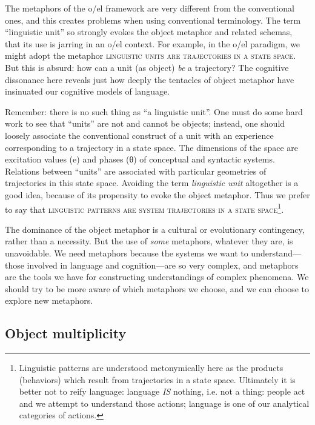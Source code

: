   The metaphors of the o/el framework are very different from the conventional ones, and this creates problems when using conventional terminology. The term “linguistic unit” so strongly evokes the object metaphor and related schemas, that its use is jarring in an o/el context. For example, in the o/el paradigm, we might adopt the metaphor \textsc{linguistic units are trajectories in a state space}. But this is absurd: how can a unit (as object) \textit{be} a trajectory? The cognitive dissonance here reveals just how deeply the tentacles of object metaphor have insinuated our cognitive models of language.

  Remember: there is no such thing as “a linguistic unit”. One must do some hard work to see that “units” are not and cannot be objects; instead, one should loosely associate the conventional construct of a unit with an experience corresponding to a trajectory in a state space. The dimensions of the space are excitation values (e) and phases (θ) of conceptual and syntactic systems. Relations between “units” are associated with particular geometries of trajectories in this state space. Avoiding the term \textit{linguistic unit} altogether is a good idea, because of its propensity to evoke the object metaphor. Thus we prefer to say that \textsc{linguistic patterns are system trajectories in a state space}\footnote{Linguistic patterns are understood metonymically here as the products (behaviors) which result from trajectories in a state space. Ultimately it is better not to reify language: language \textit{IS} nothing, i.e. not a thing: people act and we attempt to understand those actions; language is one of our analytical categories of actions.}.

  The dominance of the object metaphor is a cultural or evolutionary contingency, rather than a necessity. But the use of \textit{some} metaphors, whatever they are, is unavoidable. We need metaphors because the systems we want to understand—those involved in language and cognition—are so very complex, and metaphors are the tools we have for constructing understandings of complex phenomena. We should try to be more aware of which metaphors we choose, and we can choose to explore new metaphors.

\subsection{Object multiplicity}

